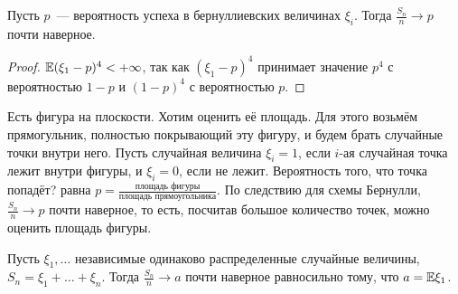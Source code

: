  \begin{corollary} Пусть $p$~--- вероятность успеха в бернуллиевских величинах $\xi_i$.
     Тогда $\frac{S_n}{n}\rightarrow p$ почти наверное.
 \end{corollary}

 \begin{proof}
     $\mathbb{E} (\xi_1 - p)^4<+\infty$, так как $(\xi_1 - p)^4$ принимает значение $p^4$ с вероятностью $1-p$ и $(1- p)^4$ с вероятностью $p$.
 \end{proof}


 \begin{example}
     Есть фигура на плоскости. Хотим оценить её площадь. Для этого возьмём прямогульник, полностью покрывающий эту фигуру, и будем брать случайные точки внутри него. Пусть случайная величина $\xi_i = 1$, если $i$-ая случайная точка лежит внутри фигуры, и $\xi_i = 0$, если не лежит. Вероятность того, что точка попадёт? равна
     $p = \frac{\text{площадь фигуры}}{\text{площадь прямоугольника}}$.
    По следствию для схемы Бернулли, $\frac{S_n}{n}\rightarrow p$ почти наверное, то есть, посчитав большое количество точек, можно оценить площадь фигуры.
 \end{example}

 \begin{theorem} 
    Пусть $\xi_1, \ldots$ независимые одинаково распределенные случайные величины,
     $S_n = \xi_1 + \ldots + \xi_n$. Тогда $\frac{S_n}{n}\rightarrow a$ почти наверное равносильно тому, что $a=\mathbb{E} \xi_1$.
 \end{theorem}
 \newpage
